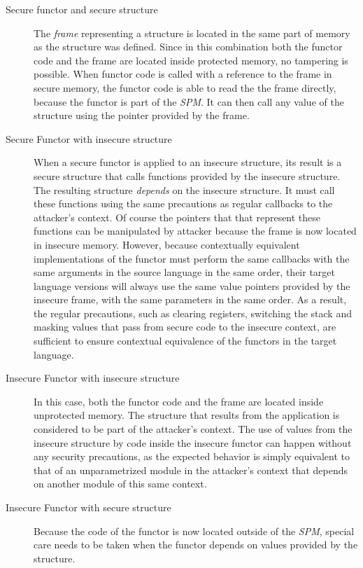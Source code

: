\documentclass[10pt,a4paper,master=cws, masteroption=ai,english,inputenc=utf8]{kulemt}
\begin{document}
\begin{description}
\item[Secure functor and secure structure] 
The \emph{frame} representing a structure is located in the same part of memory as the structure was defined.
Since in this combination both the functor code and the frame are located inside protected memory, no tampering is possible.
When functor code is called with a reference to the frame in secure memory, the functor code is able to read the the frame directly, because the functor is part of the \emph{SPM}. It can then call any value of the structure using the pointer provided by the frame.
\item[Secure Functor with insecure structure]
When a secure functor is applied to an insecure structure, its result is a secure structure that calls functions provided by the insecure structure.
The resulting structure \emph{depends} on the insecure structure.
It must call these functions using the same precautions as regular callbacks to the attacker's context.
Of course the pointers that that represent these functions can be manipulated by attacker because the frame is now located in insecure memory.
However, because contextually equivalent implementations of the functor must perform the same callbacks with the same arguments in the source language in the same order, their target language versions will always use the same value pointers provided by the insecure frame, with the same parameters in the same order.
As a result, the regular precautions, such as clearing registers, switching the stack and masking values that pass from secure code to the insecure context, are sufficient to ensure contextual equivalence of the functors in the target language.
\item[Insecure Functor with insecure structure]
In this case, both the functor code and the frame are located inside unprotected memory.
The structure that results from the application is considered to be part of the attacker's context.
The use of values from the insecure structure by code inside the insecure functor can happen without any security precautions, as the expected behavior is simply equivalent to that of an unparametrized module in the attacker's context that depends on another module of this same context.
\item[Insecure Functor with secure structure]
Because the code of the functor is now located outside of the \emph{SPM}, special care needs to be taken when the functor depends on values provided by the structure.

\end{description}
\end{document}
